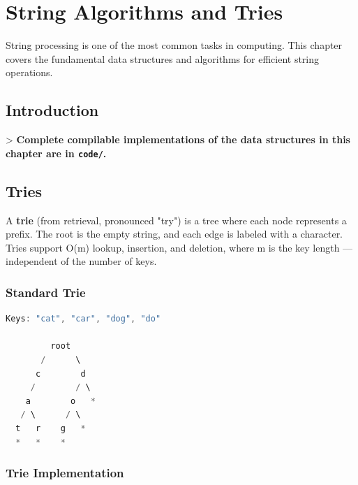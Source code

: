 \chapter{String Algorithms and Tries}\label{ch13:string-algorithms-and-tries}

String processing is one of the most common tasks in computing. This chapter covers the fundamental data structures and algorithms for efficient string operations.

\section{Introduction}

> \textbf{Complete compilable implementations of the data structures in this chapter are in \texttt{code/}.}

\section{Tries}

A \textbf{trie} (from retrieval, pronounced "try") is a tree where each node represents a prefix. The root is the empty string, and each edge is labeled with a character. Tries support O(m) lookup, insertion, and deletion, where m is the key length — independent of the number of keys.

\subsection{Standard Trie}

\begin{lstlisting}[language=Java]
Keys: "cat", "car", "dog", "do"

         root
       /      \
      c        d
     /        / \
    a        o   *
   / \      / \
  t   r    g   *
  *   *    *
\end{lstlisting}

\subsection{Trie Implementation}

